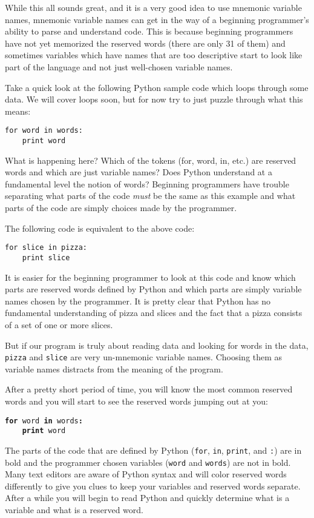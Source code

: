 \begin{ex}
While this all sounds great, and it is a very good idea to use mnemonic variable
names, mnemonic variable names can get in the way of a beginning programmer's 
ability to parse and understand code.  This is because beginning programmers 
have not yet memorized the reserved words (there are only 31 of them) and sometimes
variables which have names that are too descriptive start to look like 
part of the language and not just well-chosen variable names.

Take a quick look at the following Python sample code which loops through some data. 
We will cover loops soon, but for now try to just puzzle through what this means:

\beforeverb
\begin{verbatim}
for word in words:
    print word
\end{verbatim}
\afterverb
%
What is happening here?  Which of the tokens (for, word, in, etc.) are reserved words
and which are just variable names?  Does Python understand at a fundamental level 
the notion of words?  Beginning programmers have 
trouble separating what parts of the
code \emph{must} be the same as this example and what parts of the code are simply
choices made by the programmer.

The following code is equivalent to the above code:

\beforeverb
\begin{verbatim}
for slice in pizza:
    print slice
\end{verbatim}
\afterverb
%
It is easier for the beginning programmer to look at this code and know which 
parts are reserved words defined by Python and which parts are simply variable
names chosen by the programmer.  It is pretty clear that Python has no fundamental
understanding of pizza and slices and the fact that a pizza consists of a set
of one or more slices.

But if our program is truly about reading data and looking for words in the data,
{\tt pizza} and {\tt slice} are very un-mnemonic variable names.  Choosing them 
as variable names distracts from the meaning of the program.

After a pretty short period of time, you will know the most common reserved words
and you will start to see the reserved words jumping out at you:

{\tt {\bf for} word {\bf in} words{\bf :}\\
\verb"    "{\bf print} word }

The parts of the code that are defined by 
Python ({\tt for}, {\tt in}, {\tt print}, and {\tt :}) are in bold
and the programmer chosen variables ({\tt word} and {\tt words}) are not in bold.  
Many text editors are aware of Python
syntax and will color reserved words differently to give you clues to keep 
your variables and reserved words separate.
After a while you will begin to read Python and quickly determine what
is a variable and what is a reserved word.


\end{ex}
